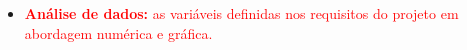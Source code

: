 \begin{itemize}
    \item \textcolor{red}{ \textbf{Análise de dados:} as variáveis definidas nos requisitos do projeto em abordagem numérica e gráfica.}
\end{itemize}

